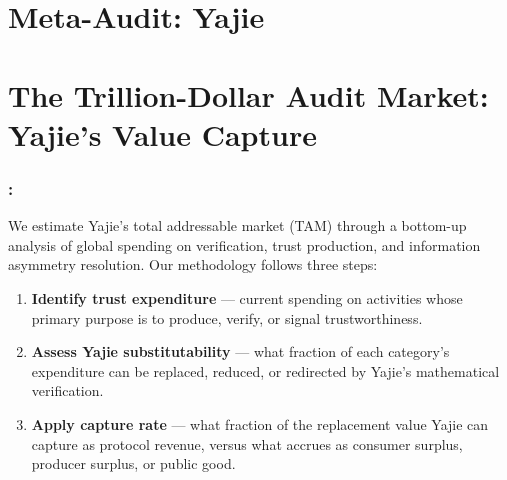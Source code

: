 \documentclass[12pt,a4paper]{article}
\theoremstyle{remark}
\begin{document}
\part{Meta-Audit: Yajie}
\part{The Trillion-Dollar Audit Market: Yajie's Value Capture}
\section{:}
We estimate Yajie's total addressable market (TAM) through a bottom-up analysis of global 
spending on verification, trust production, and information asymmetry resolution. Our 
methodology follows three steps:
\begin{enumerate}[label= \arabic*, leftmargin=*]
 \item \textbf{Identify trust expenditure} --- current spending on activities whose primary 
 purpose is to produce, verify, or signal trustworthiness. \
 \item \textbf{Assess Yajie substitutability} --- what fraction of each category's 
 expenditure can be replaced, reduced, or redirected by Yajie's mathematical 
 verification. \
 \item \textbf{Apply capture rate} --- what fraction of the replacement value Yajie 
 can capture as protocol revenue, versus what accrues as consumer surplus, 
 producer surplus, or public good. \
\end{enumerate}
\end{document}

